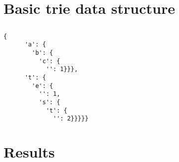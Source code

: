 \documentclass[slidestop]{beamer}
\begin{document}
\section{Basic trie data structure}
\subsection{}
\begin{pframe}
  \begin{lstlisting}[language=none, caption=.]
    {
      'a': {
        'b': {
          'c': {
            '': 1}}},
      't': {
        'e': {
          '': 1,
          's': {
            't': {
              '': 2}}}}}
  \end{lstlisting}
\end{pframe}


\section{Results}
\subsection{}
\begin{pframe}
  
\end{pframe}


\end{document}
